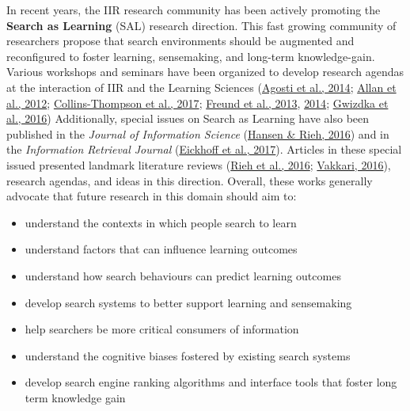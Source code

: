 \documentclass[a4paper, nobind]{templates/ociamthesis}
\begin{document}
In recent years, the IIR research community has been actively promoting
the \textbf{Search as Learning} (SAL) research direction. This fast growing
community of researchers propose that search environments should be
augmented and reconfigured to foster learning, sensemaking, and
long-term knowledge-gain. Various workshops and seminars have been
organized to develop research agendas at the interaction of IIR and the
Learning Sciences
(\protect\hyperlink{ref-agosti2014evaluation}{Agosti et al., 2014}; \protect\hyperlink{ref-allan2012frontiers}{Allan et al., 2012}; \protect\hyperlink{ref-collins2017search}{Collins-Thompson et al., 2017}; \protect\hyperlink{ref-freund2013searching}{Freund et al., 2013}, \protect\hyperlink{ref-freund2014searching}{2014}; \protect\hyperlink{ref-gwizdka2016search}{Gwizdka et al., 2016})
Additionally, special issues on Search as Learning have also been
published in the \emph{Journal of Information Science} (\protect\hyperlink{ref-hansen2016editorial}{Hansen \& Rieh, 2016})
and in the \emph{Information Retrieval Journal} (\protect\hyperlink{ref-eickhoff2017introduction}{Eickhoff et al., 2017}).
Articles in these special issued presented landmark literature reviews
(\protect\hyperlink{ref-rieh2016searching}{Rieh et al., 2016}; \protect\hyperlink{ref-vakkari2016searching}{Vakkari, 2016}), research agendas, and ideas
in this direction. Overall, these works generally advocate that future
research in this domain should aim to:

\begin{itemize}
\item
  understand the contexts in which people search to learn
\item
  understand factors that can influence learning outcomes
\item
  understand how search behaviours can predict learning outcomes
\item
  develop search systems to better support learning and sensemaking
\item
  help searchers be more critical consumers of information
\item
  understand the cognitive biases fostered by existing search systems
\item
  develop search engine ranking algorithms and interface tools that
  foster long term knowledge gain
\end{itemize}
\end{document}
